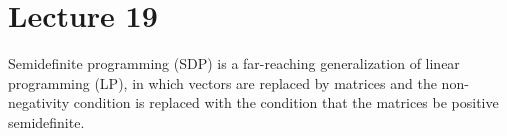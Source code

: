 %
%
% 


\chapter*{Lecture 19}
\addtocounter{chapter}{19}
\addtocounter{section}{0}


Semidefinite programming (SDP) is a far-reaching generalization of linear programming (LP), in which vectors are replaced by matrices and the non-negativity condition is replaced with the condition that the matrices be positive semidefinite. 

